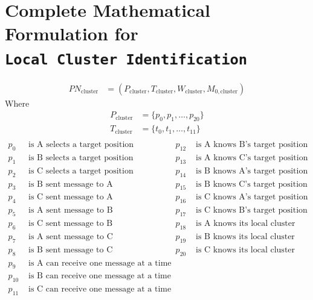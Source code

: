 \documentclass[12pt,a4paper]{article}
\begin{document}
\newpage
\appendix
\section{\texorpdfstring{Complete Mathematical Formulation for \\ \texttt{Local Cluster Identification}}{Complete Mathematical Formulation for Local Cluster Identification}}
\label{app:cluster}

\begin{align*}
    PN_{\text{cluster}} &= (P_{\text{cluster}}, T_{\text{cluster}}, W_{\text{cluster}}, M_{0, \text{cluster}})
\end{align*}
Where
\begin{align*}
    P_{\text{cluster}} &= \{p_0, p_1, \ldots, p_{20}\} \\
    T_{\text{cluster}} &= \{t_0, t_1, \ldots, t_{11}\} \\
\end{align*}
\begin{align*}
    p_0  &\text{ is A selects a target position}              & p_{12} &\text{ is A knows B's target position} \\
    p_1  &\text{ is B selects a target position}              & p_{13} &\text{ is A knows C's target position} \\
    p_2  &\text{ is C selects a target position}              & p_{14} &\text{ is B knows A's target position} \\
    p_3  &\text{ is B sent message to A}                     & p_{15} &\text{ is B knows C's target position} \\
    p_4  &\text{ is C sent message to A}                     & p_{16} &\text{ is C knows A's target position} \\
    p_5  &\text{ is A sent message to B}                     & p_{17} &\text{ is C knows B's target position} \\
    p_6  &\text{ is C sent message to B}                     & p_{18} &\text{ is A knows its local cluster} \\
    p_7  &\text{ is A sent message to C}                     & p_{19} &\text{ is B knows its local cluster} \\
    p_8  &\text{ is B sent message to C}                     & p_{20} &\text{ is C knows its local cluster} \\
    p_9  &\text{ is A can receive one message at a time}      &        & \\
    p_{10}&\text{ is B can receive one message at a time}     &        & \\
    p_{11} &\text{ is C can receive one message at a time}    &        & \\
\end{align*}
\end{document}
